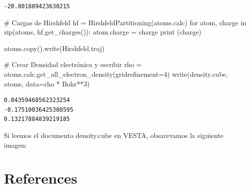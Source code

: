 \documentclass[
  letterpaper,
  DIV=11,
  numbers=noendperiod]{scrreprt}
\newenvironment{Shaded}{\begin{snugshade}}{\end{snugshade}}
\newcommand{\BuiltInTok}[1]{\textcolor[rgb]{0.00,0.23,0.31}{#1}}
\newcommand{\CommentTok}[1]{\textcolor[rgb]{0.37,0.37,0.37}{#1}}
\newcommand{\ControlFlowTok}[1]{\textcolor[rgb]{0.00,0.23,0.31}{#1}}
\newcommand{\DecValTok}[1]{\textcolor[rgb]{0.68,0.00,0.00}{#1}}
\newcommand{\KeywordTok}[1]{\textcolor[rgb]{0.00,0.23,0.31}{#1}}
\newcommand{\NormalTok}[1]{\textcolor[rgb]{0.00,0.23,0.31}{#1}}
\newcommand{\OperatorTok}[1]{\textcolor[rgb]{0.37,0.37,0.37}{#1}}
\newcommand{\StringTok}[1]{\textcolor[rgb]{0.13,0.47,0.30}{#1}}
\begin{document}
\begin{verbatim}
-20.801889423630215
\end{verbatim}

\begin{Shaded}
\begin{Highlighting}[]
\CommentTok{\# Cargas de Hirshfeld}
\NormalTok{hf }\OperatorTok{=}\NormalTok{ HirshfeldPartitioning(atoms.calc)}
\ControlFlowTok{for}\NormalTok{ atom, charge }\KeywordTok{in} \BuiltInTok{zip}\NormalTok{(atoms, hf.get\_charges()):}
\NormalTok{    atom.charge }\OperatorTok{=}\NormalTok{ charge}
    \BuiltInTok{print}\NormalTok{ (charge)}

\NormalTok{atoms.copy().write(}\StringTok{\textquotesingle{}Hirshfeld.traj\textquotesingle{}}\NormalTok{)}

\CommentTok{\# Crear Densidad electrónica y escribir}
\NormalTok{rho }\OperatorTok{=}\NormalTok{ atoms.calc.get\_all\_electron\_density(gridrefinement}\OperatorTok{=}\DecValTok{4}\NormalTok{)}
\NormalTok{write(}\StringTok{\textquotesingle{}density.cube\textquotesingle{}}\NormalTok{, atoms, data}\OperatorTok{=}\NormalTok{rho }\OperatorTok{*}\NormalTok{ Bohr}\OperatorTok{**}\DecValTok{3}\NormalTok{)}
\end{Highlighting}
\end{Shaded}

\begin{verbatim}
0.04359468562323254
-0.17510036425308595
0.13217884839219185
\end{verbatim}

Si leemos el documento density.cube en VESTA, obsarevamos la siguiente
imagen:


\hypertarget{references}{%
\chapter*{References}\label{references}}
\end{document}
